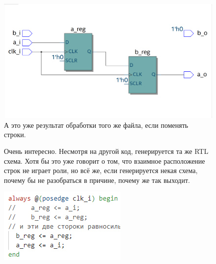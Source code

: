 \documentclass[a4paper,12pt]{article} %
\begin{document}
\begin{figure}[H]
    \centering
    \includegraphics[width=1\linewidth]{Learning/RTL_overlay1.png}
    \caption{А это уже результат обработки того же файла, если поменять строки.}
\end{figure}

\begin{figure}[H]
    \begin{minipage}[t]{0.7\textwidth}
        \vspace{0pt} %
        Очень интересно. Несмотря на другой код, генерируется та же RTL схема. Хотя бы это уже говорит о том, что взаимное расположение строк не играет роли, но всё же, если генерируется некая схема, почему бы не разобраться в причине, почему же так выходит.
    \end{minipage}%
    \hfill
    \begin{minipage}[t]{0.25\textwidth}
        \vspace{0pt} %
        \centering
        \includegraphics[width=\linewidth]{Learning/overlay_code.png}
    \end{minipage}
\end{figure}
\end{document}
